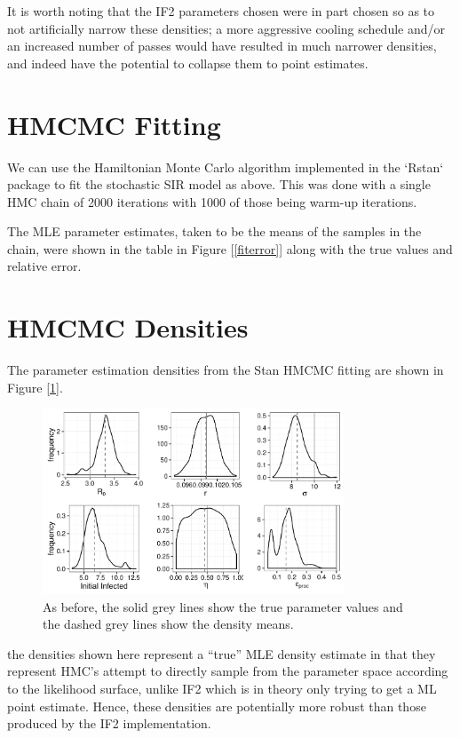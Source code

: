     It is worth noting that the IF2 parameters chosen were in part chosen so as to not artificially narrow these densities; a more aggressive cooling schedule and/or an increased number of passes would have resulted in much narrower densities, and indeed have the potential to collapse them to point estimates.


\section{HMCMC Fitting}

	We can use the Hamiltonian Monte Carlo algorithm implemented in the `Rstan` package to fit the stochastic SIR model as above. This was done with a single HMC chain of 2000 iterations with 1000 of those being warm-up iterations.

	The MLE parameter estimates, taken to be the means of the samples in the chain, were shown in the table in Figure [\ref{fiterror}] along with the true values and relative error.


\section{HMCMC Densities}

	The parameter estimation densities from the Stan HMCMC fitting are shown in Figure [\ref{hmckernels}].

	\begin{figure}
        \centering
        \captionsetup{width=.8\linewidth}
        \includegraphics[width=0.8\textwidth]{./images/hmckernels.pdf}
        \caption{As before, the solid grey lines show the true parameter values and the dashed grey lines show the density means. \label{hmckernels}}
    \end{figure}

    the densities shown here represent a ``true'' MLE density estimate in that they represent HMC's attempt to directly sample from the parameter space according to the likelihood surface, unlike IF2 which is in theory only trying to get a ML point estimate. Hence, these densities are potentially more robust than those produced by the IF2 implementation.



